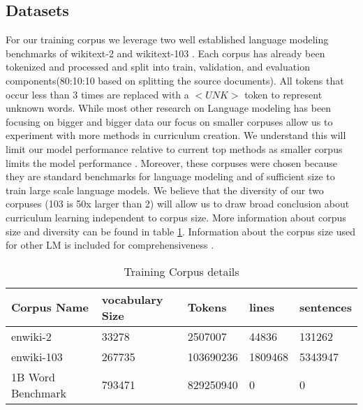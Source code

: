 \subsection{Datasets}
For our training corpus we leverage two well established language modeling benchmarks of wikitext-2 and wikitext-103 \cite{Merity2016PointerSM}. Each corpus has already been tokenized and processed and split into train, validation, and evaluation components(80:10:10 based on splitting the source documents). All tokens that occur less than 3 times are replaced with a $<UNK>$ token to represent unknown words. While most other research on Language modeling has been focusing on bigger and bigger data our focus on smaller corpuses allow us to experiment with more methods in curriculum creation. We understand this will limit our model performance relative to current top methods as smaller corpus limits the model performance \cite{Kaplan2020ScalingLF}. Moreover, these corpuses were chosen because they are standard benchmarks for language modeling and of sufficient size to train large scale language models. We believe that the diversity of our two corpuses (103 is 50x larger than 2) will allow us to draw broad conclusion about curriculum learning independent to corpus size. More information about corpus size and diversity can be found in table \ref{table:1}. Information about the corpus size used for other LM is included for comprehensiveness \cite{Chelba2014OneBW}.\\
\begin{table}[h!]
\begin{tabular}{|l|l|l|l|l|} \hline
\textbf{Corpus Name} & \textbf{vocabulary Size} & \textbf{Tokens} & \textbf{lines} & \textbf{sentences} \\ \hline
enwiki-2 & 33278 & 2507007 & 44836 & 131262 \\ \hline
enwiki-103 & 267735 & 103690236 & 1809468  & 5343947 \\ \hline
1B Word Benchmark & 793471 & 829250940 & 0 & 0 \\ \hline
\end{tabular}
\caption{Training Corpus details}
\label{table:1}
\end{table}
